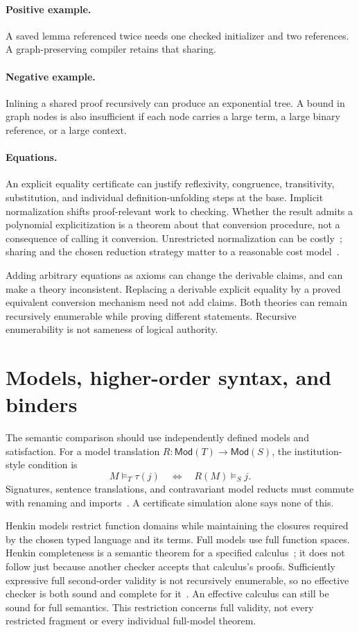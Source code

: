 \documentclass[11pt]{article}
\begin{document}
\paragraph{Positive example.}
A saved lemma referenced twice needs one checked initializer and two
references. A graph-preserving compiler retains that sharing.
\paragraph{Negative example.}
Inlining a shared proof recursively can produce an exponential tree.
A bound in graph nodes is also insufficient if each node carries a
large term, a large binary reference, or a large context.

\paragraph{Equations.}
An explicit equality certificate can justify reflexivity, congruence,
transitivity, substitution, and individual definition-unfolding steps at
the base. Implicit normalization shifts proof-relevant work to checking.
Whether the result admits a polynomial explicitization is a theorem about
that conversion procedure, not a consequence of calling it conversion.
Unrestricted normalization can be costly~\cite{statman}; sharing and the
chosen reduction strategy matter to a reasonable cost model~\cite{accattoli}.

Adding arbitrary equations as axioms can change the derivable claims,
and can make a theory inconsistent. Replacing a derivable explicit
equality by a proved equivalent conversion mechanism need not add claims.
Both theories can remain recursively enumerable while proving different
statements. Recursive enumerability is not sameness of logical authority.

\section{Models, higher-order syntax, and binders}
The semantic comparison should use independently defined models and
satisfaction. For a model translation $R:\mathsf{Mod}(T)\to\mathsf{Mod}(S)$,
the institution-style condition is
\[
 M\models_T\tau(j) \quad\Longleftrightarrow\quad R(M)\models_S j.
\]
Signatures, sentence translations, and contravariant model reducts must
commute with renaming and imports~\cite{institutions}. A certificate
simulation alone says none of this.

Henkin models restrict function domains while maintaining the closures
required by the chosen typed language and its terms. Full models use full
function spaces. Henkin completeness is a semantic theorem for a specified
calculus~\cite{henkin}; it does not follow just because another checker
accepts that calculus's proofs. Sufficiently expressive full second-order
validity is not recursively enumerable, so no effective checker is both
sound and complete for it~\cite{vaananen}. An effective calculus can still
be sound for full semantics. This restriction concerns full validity,
not every restricted fragment or every individual full-model theorem.
\end{document}
